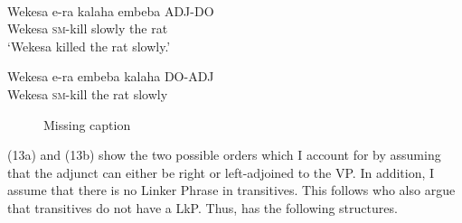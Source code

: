 \documentclass[output=paper,newtxmath,modfonts,nonflat,draft]{langsci/langscibook}
\begin{document}
\ea\label{ex:selvanathan:13}
\\
\ea\label{ex:selvanathan:13a}
\gll Wekesa  e-ra     kalaha   embeba  ADJ-DO \\
Wekesa   \textsc{sm}{}-kill   slowly    {the rat} \\
\glt `Wekesa killed the rat slowly.'

\ex\label{ex:selvanathan:13b}
\gll Wekesa  e-ra     embeba  kalaha   DO-ADJ \\
Wekesa   \textsc{sm}{}-kill   {the rat}    slowly \\
\z
\z
  
\begin{figure}
%
	\caption{\label{fig:selvanathan:5}\color{red}Missing caption}
\end{figure}

   
 (13a) and (13b) show the two possible orders which I account for by assuming that the  adjunct can either be right or left-adjoined to the VP. In addition, I assume that there is no Linker Phrase in transitives. This follows \citet{Baker2006} who also argue that  transitives do not have a LkP. Thus,   has the following structures.
\end{document}
